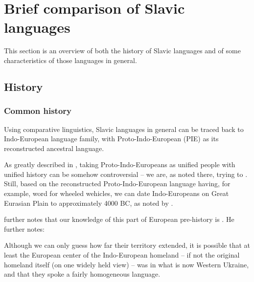 \chapter{Brief comparison of Slavic languages}

This section is an overview of both the history of Slavic languages and of some characteristics of those languages in general.


\section{History}


\subsection{Common history}

\label{ch:common_history}

Using comparative linguistics, Slavic languages in general can be traced back to Indo-European language family, with Proto-Indo-European (PIE) as its reconstructed ancestral language. 

As greatly described in \cite{oxfordintro}, taking Proto-Indo-Europeans as unified people with unified history can be somehow controversial -- we are, as noted there, trying to . Still, based on the reconstructed Proto-Indo-European language having, for example, word for wheeled wehicles, we can date Indo-Europeans on Great Eurasian Plain to approximately 4000 BC, as noted by \cite{sussex2011slavic}.

\cite{sussex2011slavic} further notes that our knowledge of this part of European pre-history is . He further notes:

\begin{quotee}Although we can only guess how far their territory extended, it is possible that at least the European center of the Indo-European homeland -- if
not the original homeland itself (on one widely held view) -- was in what is now Western Ukraine, and that they spoke a fairly homogeneous language.\end{quotee}

